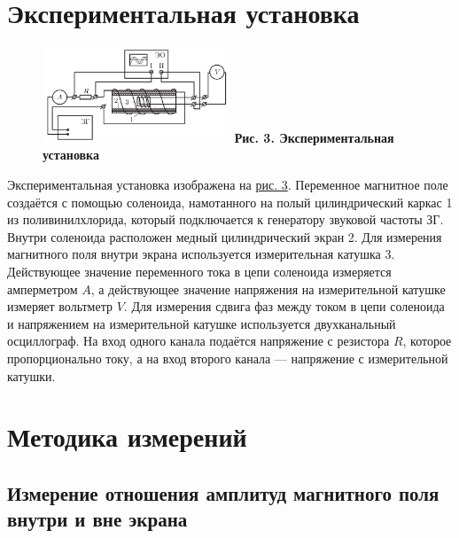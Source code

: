 \documentclass[15pt,a5paper,reqno]{article}
\begin{document}
\section{Экспериментальная установка}

    \hypertarget{pic_3}{\begin{figure}
        \includegraphics[width=0.5\textwidth]{images/picture_3.png}
        \textbf{Рис. 3. Экспериментальная установка}
    \end{figure}}

    Экспериментальная установка изображена на \hyperlink{pic_3}{рис. 3}. Переменное магнитное поле создаётся с помощью соленоида, намотанного на полый цилиндрический каркас 1 из поливинилхлорида, который подключается к генератору звуковой частоты ЗГ. Внутри соленоида расположен медный цилиндрический экран 2. Для измерения магнитного поля внутри экрана используется измерительная катушка 3. Действующее значение переменного тока в цепи соленоида измеряется амперметром $A$, а действующее значение напряжения на измерительной катушке измеряет вольтметр $V$. Для измерения
    сдвига фаз между током в цепи соленоида и напряжением на измерительной катушке используется двухканальный осциллограф. На вход одного канала подаётся напряжение с резистора $R$, которое пропорционально току, а на вход второго канала — напряжение с измерительной катушки.

\section{Методика измерений}

    \subsection{Измерение отношения амплитуд магнитного поля внутри и вне экрана}
\end{document}
